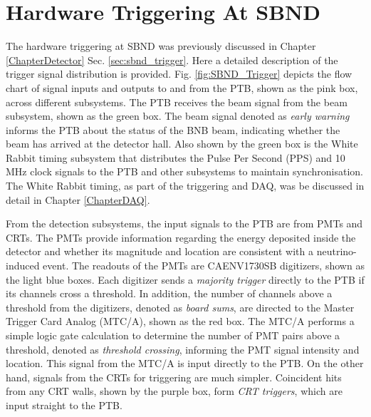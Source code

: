 
\chapter{Hardware Triggering At SBND} 
\label{appendix_hardware_trigger}
\ifpdf
    \graphicspath{{Appendix1/Figs/Raster/}{Appendix1/Figs/PDF/}{Appendix1/Figs/}}
\else
    \graphicspath{{Appendix1/Figs/Vector/}{Appendix1/Figs/}}
\fi

The hardware triggering at SBND was previously discussed in Chapter \ref{ChapterDetector} Sec. \ref{sec:sbnd_trigger}.
Here a detailed description of the trigger signal distribution is provided.
Fig. \ref{fig:SBND_Trigger} depicts the flow chart of signal inputs and outputs to and from the PTB, shown as the pink box, across different subsystems.  
The PTB receives the beam signal from the beam subsystem, shown as the green box.
The beam signal denoted as \textit{early warning} informs the PTB about the status of the BNB beam, indicating whether the beam has arrived at the detector hall.
Also shown by the green box is the White Rabbit timing subsystem that distributes the Pulse Per Second (PPS) and 10 MHz clock signals to the PTB and other subsystems to maintain synchronisation.
The White Rabbit timing, as part of the triggering and DAQ, was be discussed in detail in Chapter \ref{ChapterDAQ}.

From the detection subsystems, the input signals to the PTB are from PMTs and CRTs.
The PMTs provide information regarding the energy deposited inside the detector and whether its magnitude and location are consistent with a neutrino-induced event.
The readouts of the PMTs are CAENV1730SB digitizers, shown as the light blue boxes.
Each digitizer sends a \textit{majority trigger} directly to the PTB if its channels cross a threshold.
In addition, the number of channels above a threshold from the digitizers, denoted as \textit{board sums}, are directed to the Master Trigger Card Analog (MTC/A), shown as the red box.    
The MTC/A performs a simple logic gate calculation to determine the number of PMT pairs above a threshold, denoted as \textit{threshold crossing}, informing the PMT signal intensity and location.
This signal from the MTC/A is input directly to the PTB.  
On the other hand, signals from the CRTs for triggering are much simpler.
Coincident hits from any CRT walls, shown by the purple box, form \textit{CRT triggers}, which are input straight to the PTB.

